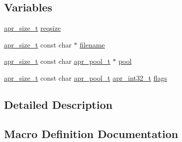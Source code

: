 \subsection*{Variables}
\begin{DoxyCompactItemize}
\item 
\hyperlink{group__apr__platform_gaaa72b2253f6f3032cefea5712a27540e}{apr\+\_\+size\+\_\+t} \hyperlink{group__apr__shm_gab0526251505fe7f4db6377b7617e16d9}{reqsize}
\item 
\hyperlink{group__apr__platform_gaaa72b2253f6f3032cefea5712a27540e}{apr\+\_\+size\+\_\+t} const char $\ast$ \hyperlink{group__apr__shm_ga7efa5e9c7494c7d4586359300221aa5d}{filename}
\item 
\hyperlink{group__apr__platform_gaaa72b2253f6f3032cefea5712a27540e}{apr\+\_\+size\+\_\+t} const char \hyperlink{structapr__pool__t}{apr\+\_\+pool\+\_\+t} $\ast$ \hyperlink{group__apr__shm_ga51fbc0d90e2519e2e42e03c5dd9f441b}{pool}
\item 
\hyperlink{group__apr__platform_gaaa72b2253f6f3032cefea5712a27540e}{apr\+\_\+size\+\_\+t} const char \hyperlink{structapr__pool__t}{apr\+\_\+pool\+\_\+t} \hyperlink{group__apr__platform_ga21ef1e35fd3ff9be386f3cb20164ff02}{apr\+\_\+int32\+\_\+t} \hyperlink{group__apr__shm_ga4da5463a54fc275129fa27f262592b0c}{flags}
\end{DoxyCompactItemize}


\subsection{Detailed Description}


\subsection{Macro Definition Documentation}
